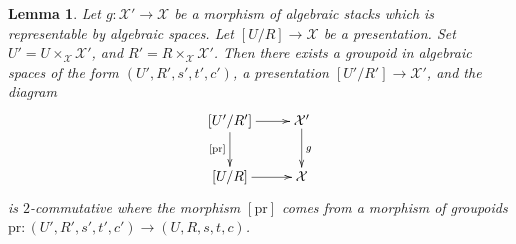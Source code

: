\documentclass{stacks-project}
\theoremstyle{plain}
\newtheorem{lemma}[subsection]{Lemma}
\theoremstyle{definition}
\theoremstyle{remark}
\numberwithin{equation}{subsection}
\begin{document}
\begin{lemma}
\label{lemma-representable-in-terms-presentations}
Let $g : \mathcal{X}' \to \mathcal{X}$ be a morphism of algebraic stacks
which is representable by algebraic spaces. Let $[U/R] \to \mathcal{X}$
be a presentation. Set $U' = U \times_\mathcal{X} \mathcal{X}'$,
and $R' = R \times_\mathcal{X} \mathcal{X}'$.
Then there exists a groupoid in algebraic spaces of the form
$(U', R', s', t', c')$, a presentation $[U'/R'] \to \mathcal{X}'$,
and the diagram
$$
\xymatrix{
[U'/R'] \ar[d]_{[\text{pr}]} \ar[r] & \mathcal{X}' \ar[d]^g \\
[U/R] \ar[r] & \mathcal{X}
}
$$
is $2$-commutative where the morphism $[\text{pr}]$ comes from a
morphism of groupoids
$\text{pr} : (U', R', s', t', c') \to (U, R, s, t, c)$.
\end{lemma}
\end{document}
